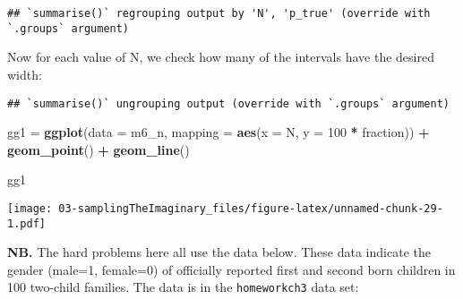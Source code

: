 \documentclass[
]{book}
\newenvironment{Shaded}{\begin{snugshade}}{\end{snugshade}}
\newcommand{\DataTypeTok}[1]{\textcolor[rgb]{0.13,0.29,0.53}{#1}}
\newcommand{\DecValTok}[1]{\textcolor[rgb]{0.00,0.00,0.81}{#1}}
\newcommand{\FloatTok}[1]{\textcolor[rgb]{0.00,0.00,0.81}{#1}}
\newcommand{\KeywordTok}[1]{\textcolor[rgb]{0.13,0.29,0.53}{\textbf{#1}}}
\newcommand{\NormalTok}[1]{#1}
\newcommand{\OperatorTok}[1]{\textcolor[rgb]{0.81,0.36,0.00}{\textbf{#1}}}
\newcommand{\StringTok}[1]{\textcolor[rgb]{0.31,0.60,0.02}{#1}}
\begin{document}
\begin{verbatim}
## `summarise()` regrouping output by 'N', 'p_true' (override with `.groups` argument)
\end{verbatim}

Now for each value of N, we check how many of the intervals have the desired width:

\begin{Shaded}
\end{Shaded}

\begin{verbatim}
## `summarise()` ungrouping output (override with `.groups` argument)
\end{verbatim}

\begin{Shaded}
\begin{Highlighting}[]
\NormalTok{gg1 =}\StringTok{ }\KeywordTok{ggplot}\NormalTok{(}\DataTypeTok{data =}\NormalTok{ m6_n,}
             \DataTypeTok{mapping =} \KeywordTok{aes}\NormalTok{(}\DataTypeTok{x =}\NormalTok{ N, }\DataTypeTok{y =} \DecValTok{100} \OperatorTok{*}\StringTok{ }\NormalTok{fraction)) }\OperatorTok{+}
\StringTok{    }\KeywordTok{geom_point}\NormalTok{() }\OperatorTok{+}
\StringTok{    }\KeywordTok{geom_line}\NormalTok{()}

\NormalTok{gg1}
\end{Highlighting}
\end{Shaded}

\texttt{[image: 03-samplingTheImaginary\_files/figure-latex/unnamed-chunk-29-1.pdf]}

\textbf{NB.} The hard problems here all use the data below. These data indicate the gender (male=1, female=0) of officially reported first and second born children in 100 two-child families. The data is in the \texttt{homeworkch3} data set:

\begin{Shaded}
\end{Shaded}
\end{document}
